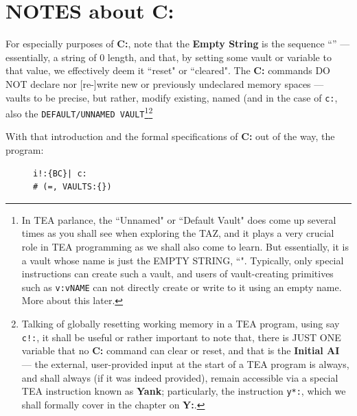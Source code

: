 \documentclass[a4paper, 18pt]{book} %
\begin{document}
\section{NOTES about C:}
\label{SECNOTESC}

For especially purposes of \textbf{C:}, note that the \textbf{Empty String} is the sequence “” --- essentially, a string of 0 length, and that, by setting some vault or variable to that value, we effectively deem it ``reset" or ``cleared". The \textbf{C:} commands DO NOT declare nor [re-]write new or previously undeclared memory spaces --- vaults to be precise, but rather, modify existing, named (and in the case of \texttt{c:}, also the \texttt{DEFAULT/UNNAMED VAULT}\footnote{In TEA parlance, the ``Unnamed" or ``Default Vault" does come up several times as you shall see when exploring the TAZ, and it plays a very crucial role in TEA programming as we shall also come to learn. But essentially, it is a vault whose name is just the EMPTY STRING, ``". Typically, only special instructions can create such a vault, and users of vault-creating primitives such as \texttt{v:vNAME} can not directly create or write to it using an empty name. More about this later.}\footnote{Talking of globally resetting working memory in a TEA program, using say \texttt{c!:}, it shall be useful or rather important to note that, there is JUST ONE variable that no \textbf{C:} command can clear or reset, and that is the \textbf{Initial AI} --- the external, user-provided input at the start of a TEA program is always, and shall always (if it was indeed provided), remain accessible via a special TEA instruction known as \textbf{Yank}; particularly, the instruction \texttt{y*:}, which we shall formally cover in the chapter on \textbf{Y:}.}


With that introduction and the formal specifications of \textbf{C:} out of the way, the program:


 \begin{figure}[H]
 \Large
  \centering
  \begin{tcolorbox}[teaterminalstyle, title=TEA Program: resetting explicitly set AI]
  \begin{lstlisting}[language=TEA, caption={TP C1}, label={LSTC1}, ]
i!:{BC}| c:
# (=, VAULTS:{})
   \end{lstlisting}
  \end{tcolorbox}
\end{figure}
\end{document}
